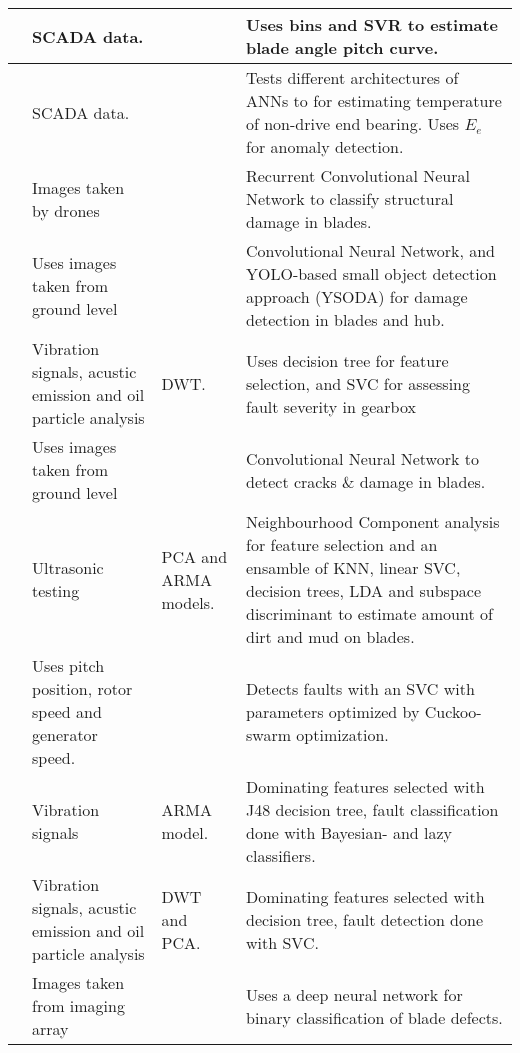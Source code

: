 \begin{longtable}{p{}p{}p{}p{}}
    \cite{SVR_blade_pitch_curve_cm} & SCADA data. & & Uses bins and SVR to estimate blade angle pitch curve. \\ \hline
    \cite{detecting_malfunctions_wt_generator_bearings_generic_vs_specific_models} & SCADA data. &  & Tests different architectures of ANNs to for estimating temperature of non-drive end bearing. Uses $E_e$ for anomaly detection. \\ \hline
    \cite{image_based_surface_damage_detection_DL_drone_inspection} & Images taken by drones & & Recurrent Convolutional Neural Network to classify structural damage in blades.\\ \hline
    \cite{image_based_YOLO_YSODA} & Uses images taken from ground level & & Convolutional Neural Network, and YOLO-based small object detection approach (YSODA) for damage detection in blades and hub.\\ \hline
    \cite{vibration_acustic_decision_tree_SVM_gearbox} & Vibration signals, acustic emission and oil particle analysis & DWT. & Uses decision tree for feature selection, and SVC for assessing fault severity in gearbox\\ \hline
    \cite{AI_image_analytics_2_classify_blade_defects} & Uses images taken from ground level & & Convolutional Neural Network to detect cracks $\&$ damage in blades.\\ \hline
    \cite{dirt_n_mud_detection_using_guided_waves} & Ultrasonic testing & PCA and ARMA models. & Neighbourhood Component analysis for feature selection and an ensamble of KNN, linear SVC, decision trees, LDA and subspace discriminant to estimate amount of dirt and mud on blades. \\ \hline
    \cite{fault_classification_using_CSO_SVM} & Uses pitch position, rotor speed and generator speed. & & Detects faults with an SVC with parameters optimized by Cuckoo-swarm optimization. \\ \hline
    \cite{vibration_ARMA_decision_tree_cm_wt} & Vibration signals & ARMA model. & Dominating features selected with J48 decision tree, fault classification done with Bayesian- and lazy classifiers. \\ \hline
    \cite{integrated_cm_bearing_fault_wt_gearbox} & Vibration signals, acustic emission and oil particle analysis & DWT and PCA. & Dominating features selected with decision tree, fault detection done with SVC. \\ \hline
    \cite{blade_defect_detection_imaging_array} & Images taken from imaging array & & Uses a deep neural network for binary classification of blade defects. \\ \hline

\end{longtable}
